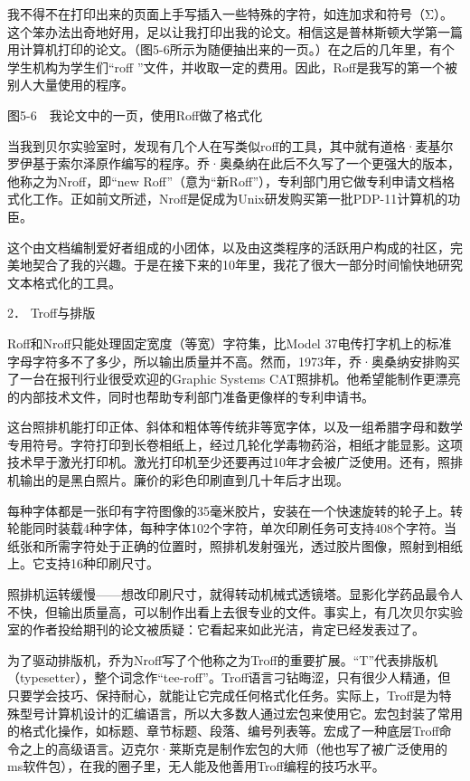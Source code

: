\documentclass[a4paper,12pt,UTF8,twoside]{ctexbook}
\begin{document}
{{我不得不在打印出来的页面上手写插入一些特殊的字符，如连加求和符号（Σ）。这个笨办法出奇地好用，足以让我打印出我的论文。相信这是普林斯顿大学第一篇用计算机打印的论文。（图5-6所示为随便抽出来的一页。）在之后的几年里，有个学生机构为学生们“roff ”文件，并收取一定的费用。因此，Roff是我写的第一个被别人大量使用的程序。



图5-6　我论文中的一页，使用Roff做了格式化

当我到贝尔实验室时，发现有几个人在写类似roff的工具，其中就有道格·麦基尔罗伊基于索尔泽原作编写的程序。乔·奥桑纳在此后不久写了一个更强大的版本，他称之为Nroff，即“new Roff”（意为“新Roff”），专利部门用它做专利申请文档格式化工作。正如前文所述，Nroff是促成为Unix研发购买第一批PDP-11计算机的功臣。

这个由文档编制爱好者组成的小团体，以及由这类程序的活跃用户构成的社区，完美地契合了我的兴趣。于是在接下来的10年里，我花了很大一部分时间愉快地研究文本格式化的工具。





2． Troff与排版


Roff和Nroff只能处理固定宽度（等宽）字符集，比Model 37电传打字机上的标准字母字符多不了多少，所以输出质量并不高。然而，1973年，乔·奥桑纳安排购买了一台在报刊行业很受欢迎的Graphic Systems CAT照排机。他希望能制作更漂亮的内部技术文件，同时也帮助专利部门准备更像样的专利申请书。

这台照排机能打印正体、斜体和粗体等传统非等宽字体，以及一组希腊字母和数学专用符号。字符打印到长卷相纸上，经过几轮化学毒物药浴，相纸才能显影。这项技术早于激光打印机。激光打印机至少还要再过10年才会被广泛使用。还有，照排机输出的是黑白照片。廉价的彩色印刷直到几十年后才出现。

每种字体都是一张印有字符图像的35毫米胶片，安装在一个快速旋转的轮子上。转轮能同时装载4种字体，每种字体102个字符，单次印刷任务可支持408个字符。当纸张和所需字符处于正确的位置时，照排机发射强光，透过胶片图像，照射到相纸上。它支持16种印刷尺寸。

照排机运转缓慢——想改印刷尺寸，就得转动机械式透镜塔。显影化学药品最令人不快，但输出质量高，可以制作出看上去很专业的文件。事实上，有几次贝尔实验室的作者投给期刊的论文被质疑：它看起来如此光洁，肯定已经发表过了。

为了驱动排版机，乔为Nroff写了个他称之为Troff的重要扩展。“T”代表排版机（typesetter），整个词念作“tee-roff”。Troff语言刁钻晦涩，只有很少人精通，但只要学会技巧、保持耐心，就能让它完成任何格式化任务。实际上，Troff是为特殊型号计算机设计的汇编语言，所以大多数人通过宏包来使用它。宏包封装了常用的格式化操作，如标题、章节标题、段落、编号列表等。宏成了一种底层Troff命令之上的高级语言。迈克尔·莱斯克是制作宏包的大师（他也写了被广泛使用的ms软件包），在我的圈子里，无人能及他善用Troff编程的技巧水平。

}}
\end{document}
